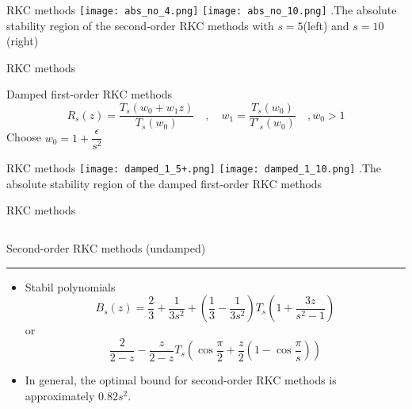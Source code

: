 \documentclass{beamer}
\begin{document}
\begin{frame}{RKC methods}
	\texttt{[image: abs\_no\_4.png]}
	\texttt{[image: abs\_no\_10.png]}
	\figurename{.The absolute stability region of the second-order RKC methods with $s=5$(left) and $s=10$(right)}
\end{frame}
\begin{frame}{RKC methods}
	\begin{beamerboxesrounded}{Damped first-order RKC methods}	
$$R_s(z)=\frac{T_s(w_0+w_1z)}{T_s(w_0)} \quad , \quad w_1=\frac{T_s(w_0)}{T'_s(w_0)} \quad , w_0>1$$
Choose $w_0=1+\dfrac{\epsilon}{s^2}$
\end{beamerboxesrounded}
\end{frame}
  \begin{frame}{RKC methods}
  		\texttt{[image: damped\_1\_5+.png]}
  	\texttt{[image: damped\_1\_10.png]}
  	\figurename{.The absolute stability region of the damped first-order RKC methods}
  \end{frame}
\begin{frame}{RKC methods}
	\begin{columns}[T] %
			\begin{column}{1.\textwidth}			
				Second-order RKC methods (undamped)
						\color{blue}\rule{\linewidth}{3pt}
						\begin{itemize}
				\item Stabil polynomials
				$$B_s(z)=\frac{2}{3}+\frac{1}{3s^2}+\left(\frac{1}{3}-\frac{1}{3s^2}\right)T_s\left(1+\frac{3z}{s^2-1}\right)$$ or
				$$\frac{2}{2-z} - \frac{z}{2-z}T_s\left(\cos \frac{\pi}{2}+\frac{z}{2}\left(1-\cos \frac{\pi}{s}\right)\right)$$
				\item In general, the optimal bound for second-order RKC methods is approximately
				$0.82s^2$.
			\end{itemize}
		\end{column}%
	\end{columns}
	
\end{frame}
\end{document}
